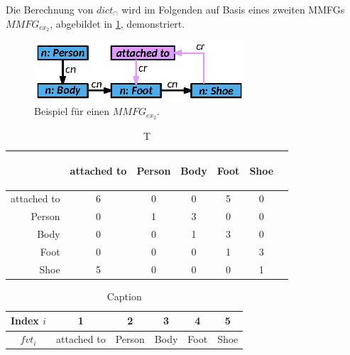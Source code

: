 Die Berechnung von $dict_{\cap}$ wird im Folgenden auf Basis eines zweiten MMFGs $MMFG_{ex_2}$, abgebildet in \cref{sec2:sota:subsec:fz-explainablity:fig:mmfg-example-2}, demonstriert.

\begin{figure}[htb]
    \centering
    \includegraphics[width=0.7\textwidth]{chapter/chapter_2/mmfg-ex2.eps}
    \caption{Beispiel für einen $MMFG_{ex_2}$.}
    \label{sec2:sota:subsec:fz-explainablity:fig:mmfg-example-2}
\end{figure}

\begin{table}[htb]
    \centering
    \begin{tabular}{rcccccc}
         &  \begin{turn}{90}attached to\end{turn}& \begin{turn}{90}Person\end{turn} & \begin{turn}{90}Body\end{turn} & \begin{turn}{90}Foot\end{turn} & \begin{turn}{90}Shoe\end{turn} \\ \hline
        attached to      & \cellcolor{comprel}6 & 0 & 0 & \cellcolor{comprel}5 & 0  \\ 
        Person           & 0 & \cellcolor{nodeblue}1 & \cellcolor{nodeblue}3 & 0 & 0  \\
        Body             & 0 & 0 & \cellcolor{nodeblue}1 & \cellcolor{nodeblue}3 & 0  \\ 
        Foot             & 0 & 0 & 0 & \cellcolor{nodeblue}1 & \cellcolor{nodeblue}3  \\ 
        Shoe             & \cellcolor{comprel}5 & 0 & 0 & 0 & \cellcolor{nodeblue}1           
    \end{tabular}
    \caption{T}
    \label{tab:my_label}
\end{table}

\begin{table}[htb]
    \centering
    \begin{tabular}{c|c|c|c|c|c}
        Index $i$ & 1 & 2 & 3 & 4 & 5 \\ \hline
        $fvt_i$ & attached to & Person & Body & Foot & Shoe
    \end{tabular}
    \caption{Caption}
    \label{tab:my_label}
\end{table}